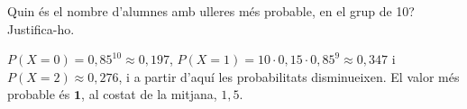 \begin{apartats}
\begin{nomesllarg}
Quin és el nombre d'alumnes amb ulleres més probable, en el grup de 10? Justifica-ho.

\begin{solucio}
$P(X=0)=0{,}85^{10}\approx0{,}197$, $P(X=1)=10\cdot0{,}15\cdot0{,}85^9\approx0{,}347$ i
$P(X=2)\approx0{,}276$, i a partir d'aquí les probabilitats disminueixen. El valor més probable és
$\mathbf{1}$, al costat de la mitjana, $1{,}5$.
\end{solucio}
\end{nomesllarg}

\end{apartats}
